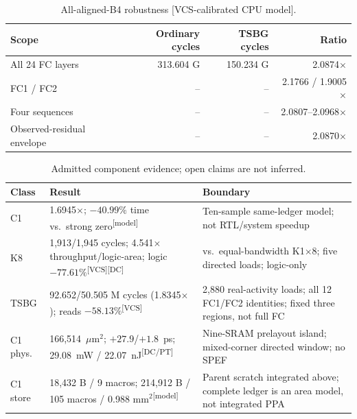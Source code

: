 \documentclass[journal]{IEEEtran}
\newcommand{\modeltag}{\textsuperscript{[model]}}
\newcommand{\vcstag}{\textsuperscript{[VCS]}}
\newcommand{\dctag}{\textsuperscript{[DC]}}
\newcommand{\pttag}{\textsuperscript{[DC/PT]}}
\begin{document}
\begin{table}[t]
\caption{All-aligned-B4 robustness [VCS-calibrated CPU model].}
\label{tab:fulltoken}
\centering
\scriptsize
\begin{tabular}{@{}lrrr@{}}
\toprule
Scope & Ordinary cycles & TSBG cycles & Ratio \\
\midrule
All 24 FC layers & 313.604 G & 150.234 G & 2.0874$\times$ \\
FC1 / FC2 & -- & -- & 2.1766 / 1.9005$\times$ \\
Four sequences & -- & -- & 2.0807--2.0968$\times$ \\
Observed-residual envelope & -- & -- & 2.0870$\times$ \\
\bottomrule
\end{tabular}
\end{table}

\begin{table}[t]
\caption{Admitted component evidence; open claims are not inferred.}
\label{tab:main}
\centering
\scriptsize
\begin{tabular}{@{}L{0.13\columnwidth}L{0.37\columnwidth}L{0.36\columnwidth}@{}}
\toprule
Class & Result & Boundary \\
\midrule
C1 & 1.6945$\times$; $-40.99\%$ time vs.\ strong zero\modeltag & Ten-sample same-ledger model; not RTL/system speedup \\
K8 & 1,913/1,945 cycles; 4.541$\times$ throughput/logic-area; logic $-77.61\%$\vcstag\dctag & vs.\ equal-bandwidth K1$\times$8; five directed loads; logic-only \\
TSBG & 92.652/50.505 M cycles (1.8345$\times$); reads $-58.13\%$\vcstag & 2,880 real-activity loads; all 12 FC1/FC2 identities; fixed three regions, not full FC \\
C1 phys. & 166{,}514~$\mu$m$^2$; $+27.9$/$+1.8$~ps; 29.08~mW / 22.07~nJ\pttag & Nine-SRAM prelayout island; mixed-corner directed window; no SPEF \\
C1 store & 18{,}432 B / 9 macros; 214{,}912 B / 105 macros / 0.988 mm$^2$\modeltag & Parent scratch integrated above; complete ledger is an area model, not integrated PPA \\
\bottomrule
\end{tabular}
\end{table}
\end{document}
